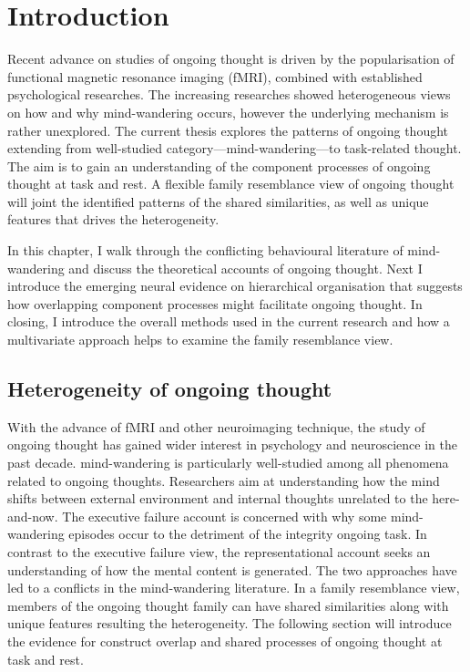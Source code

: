 \chapter{Introduction}
\label{ch:intro}


Recent advance on studies of ongoing thought is driven by the popularisation of functional magnetic resonance imaging (fMRI), combined with established psychological researches. The increasing researches showed heterogeneous views on how and why mind-wandering occurs, however the underlying mechanism is rather unexplored. The current thesis explores the patterns of ongoing thought extending from well-studied category---mind-wandering---to task-related thought. The aim is to gain an understanding of the component processes of ongoing thought at task and rest. A flexible family resemblance view \cite{Seli2018} of ongoing thought will joint the identified patterns of the shared similarities, as well as unique features that drives the heterogeneity.

In this chapter, I walk through the conflicting behavioural literature of mind-wandering and discuss the theoretical accounts of ongoing thought. Next I introduce the emerging neural evidence on hierarchical organisation that suggests how overlapping component processes might facilitate ongoing thought. In closing, I introduce the overall methods used in the current research and how a multivariate approach helps to examine the family resemblance view.

\section{Heterogeneity of ongoing thought}
\label{ch:intro:heterogeneity}


With the advance of fMRI and other neuroimaging technique, the study of ongoing thought has gained wider interest in psychology and neuroscience in the past decade. mind-wandering is particularly well-studied among all phenomena related to ongoing thoughts. Researchers aim at understanding how the mind shifts between external environment and internal thoughts unrelated to the here-and-now. 
The executive failure account is concerned with why some mind-wandering episodes occur to the detriment of the integrity ongoing task. In contrast to the executive failure view, the representational account seeks an understanding of how the mental content is generated. The two approaches have led to a conflicts in the mind-wandering literature. In a family resemblance view, members of the ongoing thought family can have shared similarities along with unique features resulting the heterogeneity. The following section will introduce the evidence for construct overlap and shared processes of ongoing thought at task and rest.

